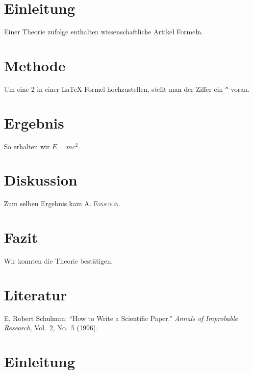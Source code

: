 \documentclass[a4paper,11pt,oneside]{report}
\begin{document}
\section{Einleitung}
Einer Theorie zufolge enthalten 
wissenschaftliche Artikel Formeln.
\section{Methode}
Um eine 2 in einer \LaTeX-Formel 
hochzustellen, stellt man der 
Ziffer ein \verb+^+ voran.
\section{Ergebnis}
So erhalten wir \(E=mc^2\).
\section{Diskussion}
Zum selben Ergebnis kam 
\textsc{A. Einstein}.
\section{Fazit}
Wir konnten die Theorie bestätigen.
\section*{Literatur}
E. Robert Schulman: ``How to Write a 
Scientific Paper.'' \textit{Annals of 
Improbable Research}, Vol.~2, No.~5
(1996).
\section{Einleitung}
\blindtext
\end{document}
